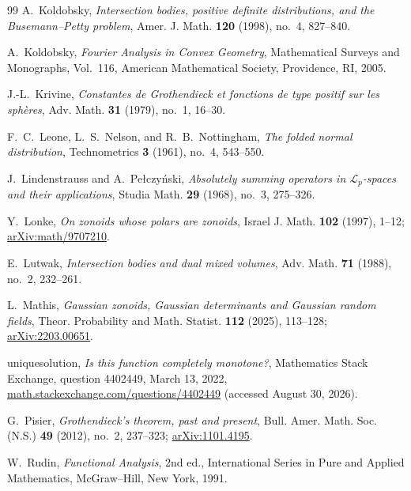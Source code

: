 \documentclass[11pt]{article}
\theoremstyle{definition}
\theoremstyle{remark}
\begin{document}
\begin{thebibliography}{99}
A.~Koldobsky,
\textit{Intersection bodies, positive definite distributions, and the
Busemann--Petty problem},
Amer. J. Math. \textbf{120} (1998), no.~4, 827--840.


A.~Koldobsky,
\textit{Fourier Analysis in Convex Geometry},
Mathematical Surveys and Monographs, Vol.~116,
American Mathematical Society, Providence, RI, 2005.

J.-L.~Krivine,
\textit{Constantes de Grothendieck et fonctions de type positif sur
les sph\`eres},
Adv. Math. \textbf{31} (1979), no.~1, 16--30.

F.~C.~Leone, L.~S.~Nelson, and R.~B.~Nottingham,
\textit{The folded normal distribution},
Technometrics \textbf{3} (1961), no.~4, 543--550.

J.~Lindenstrauss and A.~Pe{\l}czy\'nski,
\textit{Absolutely summing operators in $\mathcal L_p$-spaces and
their applications},
Studia Math. \textbf{29} (1968), no.~3, 275--326.

Y.~Lonke,
\textit{On zonoids whose polars are zonoids},
Israel J. Math. \textbf{102} (1997), 1--12;
\href{https://arxiv.org/abs/math/9707210}{arXiv:math/9707210}.


E.~Lutwak,
\textit{Intersection bodies and dual mixed volumes},
Adv. Math. \textbf{71} (1988), no.~2, 232--261.



L.~Mathis,
\textit{Gaussian zonoids, Gaussian determinants and Gaussian random
fields},
Theor. Probability and Math. Statist. \textbf{112} (2025), 113--128;
\href{https://arxiv.org/abs/2203.00651}{arXiv:2203.00651}.

uniquesolution,
\textit{Is this function completely monotone?},
Mathematics Stack Exchange, question 4402449, March 13, 2022,
\href{https://math.stackexchange.com/questions/4402449/is-this-function-completely-monotone}
{math.stackexchange.com/questions/4402449}
(accessed August 30, 2026).

G.~Pisier,
\textit{Grothendieck's theorem, past and present},
Bull. Amer. Math. Soc. (N.S.) \textbf{49} (2012), no.~2, 237--323;
\href{https://arxiv.org/abs/1101.4195}{arXiv:1101.4195}.

W.~Rudin,
\textit{Functional Analysis},
2nd ed., International Series in Pure and Applied Mathematics,
McGraw--Hill, New York, 1991.



\end{thebibliography}
\end{document}
